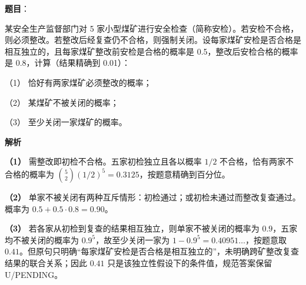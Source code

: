 \begin{answer}

\textbf{题目}：

某安全生产监督部门对 5 家小型煤矿进行安全检查（简称安检）。若安检不合格，则必须整改。若整改后经复查仍不合格，则强制关闭。设每家煤矿安检是否合格是相互独立的，且每家煤矿整改前安检是合格的概率是 0.5，整改后安检合格的概率是 0.8，计算（结果精确到 0.01）：

（1） 恰好有两家煤矿必须整改的概率；

（2） 某煤矿不被关闭的概率；

（3） 至少关闭一家煤矿的概率。

\textbf{解析}

\textbf{（1）} 需整改即初检不合格。五家初检独立且各以概率 $1/2$ 不合格，恰有两家不合格的概率为 $\binom52(1/2)^5=0.3125$，按题意精确到百分位。

\textbf{（2）} 单家不被关闭有两种互斥情形：初检通过；或初检未通过而整改复查通过。概率为 $0.5+0.5\cdot0.8=0.90$。

\textbf{（3）} 若各家从初检到复查的结果相互独立，则单家不被关闭的概率为 $0.9$，五家均不被关闭的概率为 $0.9^5$，故至少关闭一家为 $1-0.9^5=0.40951\ldots$，按题意取 $0.41$。但原句只明确“每家煤矿安检是否合格是相互独立的”，未明确跨矿整改复查结果的联合关系；因此 $0.41$ 只是该独立性假设下的条件值，规范答案保留 U/PENDING。




\end{answer}
